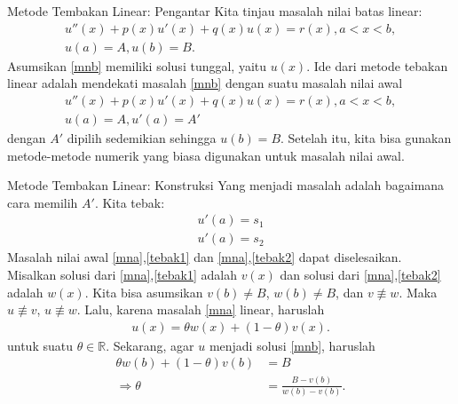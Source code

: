 \documentclass[xcolor={dvipsnames}, 9pt]{beamer}
\begin{document}
	\begin{frame}{Metode Tembakan Linear: Pengantar}
		Kita tinjau masalah nilai batas linear:
		\begin{gather}
			u''(x) + p(x)u'(x) + q(x)u(x) = r(x), a<x<b, \label{mnb} \\
			u(a) = A, u(b) = B. \nonumber
		\end{gather}
		Asumsikan \eqref{mnb} memiliki solusi tunggal, yaitu $u(x)$. Ide dari metode tebakan linear adalah mendekati masalah \eqref{mnb} dengan suatu masalah nilai awal
		\begin{gather}
			u''(x) + p(x)u'(x) + q(x)u(x) = r(x), a<x<b, \label{mna} \\
			u(a) = A, u'(a) = A' \nonumber
		\end{gather}
		dengan $A'$ dipilih sedemikian sehingga $u(b)=B$. Setelah itu, kita bisa gunakan metode-metode numerik yang biasa digunakan untuk masalah nilai awal.
	\end{frame}
	\begin{frame}{Metode Tembakan Linear: Konstruksi}
		Yang menjadi masalah adalah bagaimana cara memilih $A'$. Kita tebak:
		\begin{align}
			u'(a) = s_1 \label{tebak1}\\
			u'(a) = s_2 \label{tebak2}
		\end{align}
		Masalah nilai awal \eqref{mna},\eqref{tebak1} dan \eqref{mna},\eqref{tebak2} dapat diselesaikan. Misalkan solusi dari \eqref{mna},\eqref{tebak1} adalah $v(x)$ dan solusi dari \eqref{mna},\eqref{tebak2} adalah $w(x)$. Kita bisa asumsikan $v(b)\neq B$, $w(b)\neq B$, dan $v\not\equiv w$. Maka $u\not\equiv v$, $u\not\equiv w$. Lalu, karena masalah \eqref{mna} linear, haruslah
		\begin{align*}
			u(x) = \theta w(x) + (1-\theta)v(x).
		\end{align*}
		untuk suatu $\theta\in\mathbb{R}$. \newline
		Sekarang, agar $u$ menjadi solusi \eqref{mnb}, haruslah
		\begin{align*}
			\theta w(b) + (1-\theta)v(b) &= B \\
			\Rightarrow \theta &= \frac{B - v(b)}{w(b)-v(b)}.
		\end{align*}
	\end{frame}
\end{document}
